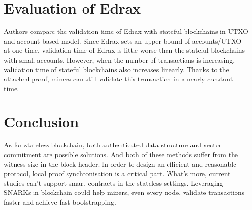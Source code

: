 \documentclass[conference]{IEEEtran}
\begin{document}
\section{Evaluation of Edrax}
Authors compare the validation time of Edrax with stateful blockchains in UTXO and account-based model.
%
Since Edrax sets an upper bound of accounts/UTXO at one time, validation time of Edrax is little worse than the stateful blockchains with small accounts.
%
However, when the number of transactions is increasing, validation time of stateful blockchains also increases linearly.
%
Thanks to the attached proof, miners can still validate this transaction in a nearly constant time. 


\section{Conclusion}
As for stateless blockchain, both authenticated data structure and vector commitment are possible solutions.
%
And both of these methods suffer from the witness size in the block header.
%
In order to design an efficient and reasonable protocol, local proof synchronisation is a critical part.
%
What's more, current studies can't support smart contracts in the stateless settings.
%
Leveraging SNARKs in blockchain could help miners, even every node, validate transactions faster and achieve fast bootstrapping.




\end{document}
